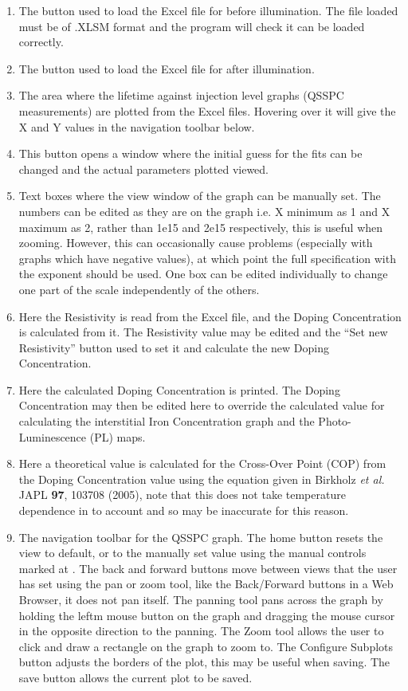 \documentclass[final,a4paper,oneside,12pt]{article}
\begin{document}
\begin{enumerate}
\item The button used to load the Excel file for before illumination. The file loaded must be of .XLSM format and the program will check it can be loaded correctly.

\item The button used to load the Excel file for after illumination.

\item The area where the lifetime against injection level graphs (QSSPC measurements) are plotted from the Excel files. Hovering over it will give the X and Y values in the navigation toolbar below.

\item This button opens a window where the initial guess for the fits can be changed and the actual parameters plotted viewed.

\item Text boxes where the view window of the graph can be manually set. The numbers can be edited as they are on the graph i.e. X minimum as 1 and X maximum as 2, rather than 1e15 and 2e15 respectively, this is useful when zooming. However, this can occasionally cause problems (especially with graphs which have negative values), at which point the full specification with the exponent should be used. One box can be edited individually to change one part of the scale independently of the others.

\item  Here the Resistivity is read from the Excel file, and the Doping Concentration is calculated from it. The Resistivity value may be edited and the ``Set new Resistivity'' button used to set it and calculate the new Doping Concentration.

\item Here the calculated Doping Concentration is printed. The Doping Concentration may then be edited here to override the calculated value for calculating the interstitial Iron Concentration graph and the Photo-Luminescence (PL) maps.

\item Here a theoretical value is calculated for the Cross-Over Point (COP) from the Doping Concentration value using the equation given in Birkholz \textit{et al.} JAPL {\bf 97}, 103708 (2005), note that this does not take temperature dependence in to account and so may be inaccurate for this reason.

\item The navigation toolbar for the QSSPC graph. The home button resets the view to default, or to the manually set value using the manual controls marked at {\color{red}{\bf 5}}. The back and forward buttons move between views that the user has set using the pan or zoom tool, like the Back/Forward buttons in a Web Browser, it does not pan itself. The panning tool pans across the graph by holding the leftm mouse button on the graph and dragging the mouse cursor in the opposite direction to the panning. The Zoom tool allows the user to click and draw a rectangle on the graph to zoom to. The Configure Subplots button adjusts the borders of the plot, this may be useful when saving. The save button allows the current plot to be saved.


\end{enumerate}
\end{document}
